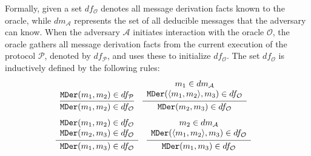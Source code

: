 Formally, given a set $ df_\mathcal{O} $ denotes all message derivation facts known to the oracle, while $ dm_\mathcal{A} $ represents the set of all deducible messages that the adversary can know.
When the adversary $ \mathcal{A} $ initiates interaction with the oracle $ \mathcal{O} $, the oracle gathers all message derivation facts from the current execution of the protocol $\mathcal{P}$, denoted by $df_\mathcal{P}$, and uses these to initialize $ df_\mathcal{O} $.
The set $ df_\mathcal{O} $ is inductively defined by the following rules:
\begin{align*}
    &\infer
        {\text{\TFact{MDer}}(m_1, m_2) \in df_\mathcal{O}}
        {\text{\TFact{MDer}}(m_1, m_2) \in df_\mathcal{P}}
    &&
    \infer
        {\text{\TFact{MDer}}(m_2, m_3) \in df_\mathcal{O}}
        {\begin{array}{c} 
            m_1 \in dm_\mathcal{A} \\ 
            \text{\TFact{MDer}}(\langle m_1, m_2 \rangle, m_3) \in df_\mathcal{O}
        \end{array}}
\end{align*}
\begin{align*}
    &\infer
        {\text{\TFact{MDer}}(m_1, m_3) \in df_\mathcal{O}}
        {\begin{array}{c} 
            \text{\TFact{MDer}}(m_1, m_2) \in df_\mathcal{O} \\ 
            \text{\TFact{MDer}}(m_2, m_3) \in df_\mathcal{O}
        \end{array}} 
    &&
    \infer
        {\text{\TFact{MDer}}(m_1, m_3) \in df_\mathcal{O}}
        {\begin{array}{c} 
            m_2 \in dm_\mathcal{A} \\ 
            \text{\TFact{MDer}}(\langle m_1, m_2 \rangle, m_3) \in df_\mathcal{O}
        \end{array}}
\end{align*}

